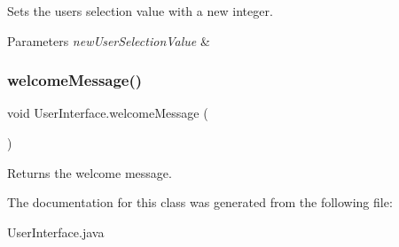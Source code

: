 Sets the user\textquotesingle{}s selection value with a new integer. 
\begin{DoxyParams}{Parameters}
{\em new\+User\+Selection\+Value} & \\
\hline
\end{DoxyParams}
\mbox{\label{class_user_interface_a8541dc8e6383dfdf708f3307b77d3e83}} 
\subsubsection{\texorpdfstring{welcome\+Message()}{welcomeMessage()}}
{\footnotesize\ttfamily void User\+Interface.\+welcome\+Message (\begin{DoxyParamCaption}{ }\end{DoxyParamCaption})\hspace{0.3cm}{\ttfamily [inline]}}

Returns the welcome message. 

The documentation for this class was generated from the following file\+:\begin{DoxyCompactItemize}
\item 
User\+Interface.\+java\end{DoxyCompactItemize}
